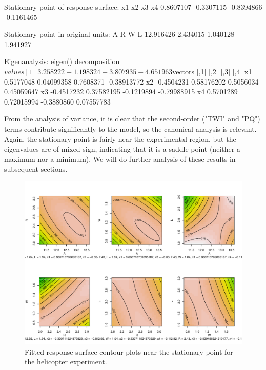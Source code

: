 \documentclass[article,nojss]{jss}
\begin{document}
\begin{Schunk}
\begin{Soutput}
Stationary point of response surface:
        x1         x2         x3         x4 
 0.8607107 -0.3307115 -0.8394866 -0.1161465 

Stationary point in original units:
        A         R         W         L 
12.916426  2.434015  1.040128  1.941927 

Eigenanalysis:
eigen() decomposition
$values
[1]  3.258222 -1.198324 -3.807935 -4.651963

$vectors
         [,1]       [,2]       [,3]        [,4]
x1  0.5177048 0.04099358  0.7608371 -0.38913772
x2 -0.4504231 0.58176202  0.5056034  0.45059647
x3 -0.4517232 0.37582195 -0.1219894 -0.79988915
x4  0.5701289 0.72015994 -0.3880860  0.07557783
\end{Soutput}
\end{Schunk}
From the analysis of variance, it is clear that the second-order ("TWI" and "PQ") terms contribute significantly to the model, so the canonical analysis is relevant.  Again, the stationary point is fairly near the experimental region, but the eigenvalues are of mixed sign, indicating that it is a saddle point (neither a maximum nor a minimum).  We will do further analysis of these results in subsequent sections.



\begin{figure}
\includegraphics[width=.8\textwidth]{rsm-fig6.pdf}
\caption{\label{heliplots} Fitted response-surface contour plots near the stationary point for the helicopter experiment.}
\end{figure}
%
\end{document}
